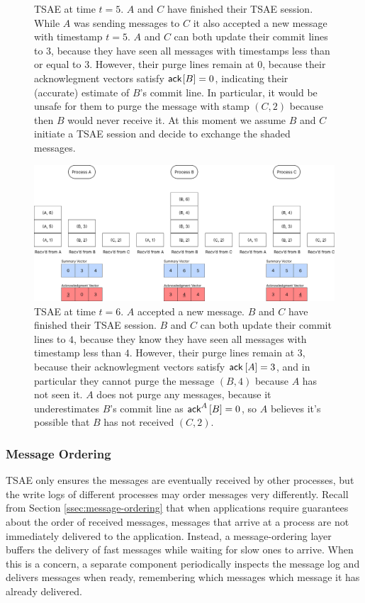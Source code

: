 \documentclass[]             %
{NASA}                       %
\theoremstyle{definition}
\begin{document}
\begin{landscape}
\begin{figure}[h]
    \caption{TSAE at time $t=5$. $A$ and $C$ have finished their TSAE session. While $A$ was sending messages to $C$ it also accepted a new message with timestamp $t=5$. $A$ and $C$ can both update their commit lines to $3$, because they have seen all messages with timestamps less than or equal to $3$. However, their purge lines remain at $0$, because their acknowlegment vectors satisfy $\textsf{ack}^{\!}\left[B\right] = 0$, indicating their (accurate) estimate of $B$'s commit line. In particular, it would be unsafe for them to purge the message with stamp $(C, 2)$ because then $B$ would never receive it. At this moment we assume $B$ and $C$ initiate a TSAE session and decide to exchange the shaded messages.}
    \label{fig:tsae5}
  \end{figure}
  \begin{figure}[h]
    \centering
    \includegraphics[width=1.4\textwidth]{images/tsae/TSAE6.png}
    \caption{TSAE at time $t=6$. $A$ accepted a new message. $B$ and $C$ have finished their TSAE session. $B$ and $C$ can both update their commit lines to $4$, because they know they have seen all messages with timestamp less than $4$. However, their purge lines remain at $3$, because their acknowlegment vectors satisfy $\textsf{ack}^{}\left[A\right] = 3$, and in particular they cannot purge the message $(B, 4)$ because $A$ has not seen it. $A$ does not purge any messages, because it underestimates $B$'s commit line as $\textsf{ack}^{A}\left[B\right] = 0$, so $A$ believes it's possible that $B$ has not received $(C, 2)$.}
    \label{fig:tsae6}
  \end{figure}
\end{landscape}
\clearpage

\subsubsection{Message Ordering}
\label{sssec:tsae-message-ordering}
TSAE only ensures the messages are eventually received by other
processes, but the write logs of different processes may order
messages very differently. Recall from Section
\ref{ssec:message-ordering} that when applications require guarantees
about the order of received messages, messages that arrive at a
process are not immediately delivered to the application. Instead, a
message-ordering layer buffers the delivery of fast messages while
waiting for slow ones to arrive. When this is a concern, a separate
component periodically inspects the message log and delivers messages
when ready, remembering which messages which message it has already
delivered.
\end{document}
